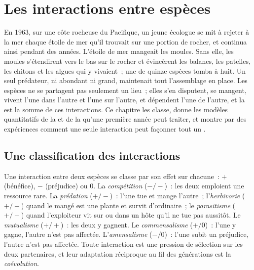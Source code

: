 \chapter{Les interactions entre espèces}\label{ch:b1:species-interactions}

En 1963, sur une côte rocheuse du Pacifique, un jeune écologue se mit à
rejeter à la mer chaque étoile de mer qu'il trouvait sur une portion de
rocher, et continua ainsi pendant des années. L'étoile de mer mangeait
les moules. Sans elle, les moules s'étendirent vers le bas sur le
rocher et évincèrent les balanes, les patelles, les chitons et les
algues qui y vivaient~; une  de quinze espèces tomba à huit. Un
seul prédateur, ni abondant ni grand, maintenait tout l'assemblage en
place. Les espèces ne se partagent pas seulement un lieu~; elles s'en
disputent, se mangent, vivent l'une dans l'autre et l'une sur l'autre,
et dépendent l'une de l'autre, et la  est la somme de ces
interactions. Ce chapitre les classe, donne les modèles quantitatifs de
la  et de la  qu'une première année peut traiter,
et montre par des expériences comment une seule interaction peut
façonner tout un .

\section{Une classification des interactions}

\begin{definition}\label{def:b1:species-interactions:types}
Une interaction entre deux espèces se classe par son effet sur
chacune~: $+$ (bénéfice), $-$ (préjudice) ou $0$. La
\emph{compétition} ($-/-$)~: les deux emploient une ressource rare. La
\emph{prédation} ($+/-$)~: l'une tue et mange l'autre~; l'\emph{herbivorie}
($+/-$) quand le mangé est une plante et survit d'ordinaire~; le
\emph{parasitisme} ($+/-$) quand l'exploiteur vit sur ou dans un hôte
qu'il ne tue pas aussitôt. Le \emph{mutualisme}
($+/+$)~: les deux y gagnent. Le \emph{commensalisme} ($+/0$)~: l'une y
gagne, l'autre n'est pas affectée. L'\emph{amensalisme} ($-/0$)~: l'une
subit un préjudice, l'autre n'est pas affectée. Toute interaction est
une pression de sélection sur les deux partenaires, et leur adaptation
réciproque au fil des générations est la \emph{coévolution}.
\end{definition}

